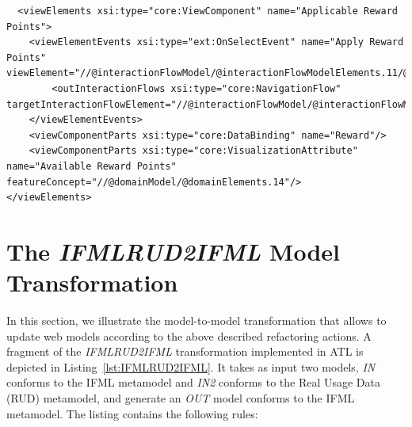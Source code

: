 \vspace{0.5cm}
\lstset{language=XML}
\begin{lstlisting} 
  <viewElements xsi:type="core:ViewComponent" name="Applicable Reward Points">
    <viewElementEvents xsi:type="ext:OnSelectEvent" name="Apply Reward Points" viewElement="//@interactionFlowModel/@interactionFlowModelElements.11/@viewElements.2/@viewElements.3">
        <outInteractionFlows xsi:type="core:NavigationFlow" targetInteractionFlowElement="//@interactionFlowModel/@interactionFlowModelElements.18/@actionEvents.0"/>
    </viewElementEvents>
    <viewComponentParts xsi:type="core:DataBinding" name="Reward"/>
    <viewComponentParts xsi:type="core:VisualizationAttribute"  name="Available Reward Points" featureConcept="//@domainModel/@domainElements.14"/>
</viewElements>
\end{lstlisting}
\vspace{0.5cm}

\newpage
\section{The \textit{IFMLRUD2IFML} Model Transformation}

In this section, we illustrate the model-to-model transformation that allows to update web models according to the above described refactoring actions. A fragment of the \textit{IFMLRUD2IFML} transformation implemented in ATL\cite{ATL} is depicted in Listing~\ref{lst:IFMLRUD2IFML}. It takes as input two models, \textit{IN}
conforms to the IFML metamodel and  \textit{IN2} conforms to the Real Usage Data (RUD) metamodel, and generate an \textit{OUT} model conforms to the IFML metamodel. The listing contains the following rules: 

